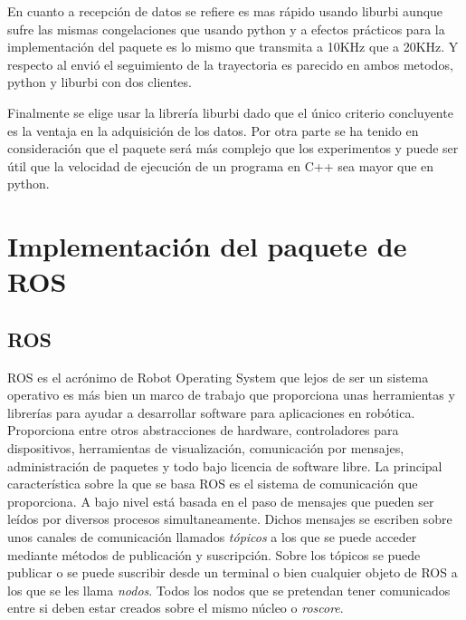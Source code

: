 \documentclass[12pt,a4paper,final,twoside]{book}
\begin{document}
En cuanto a recepción de datos se refiere es mas rápido usando liburbi aunque sufre las mismas congelaciones que usando python y a efectos prácticos para la implementación del paquete es lo mismo que transmita a 10KHz que a 20KHz. Y respecto al envió el seguimiento de la trayectoria es parecido en ambos metodos, python y liburbi con dos clientes. 

Finalmente se elige usar la librería liburbi dado que el único criterio concluyente es la ventaja en la adquisición de los datos. Por otra parte se ha tenido en consideración que el paquete será más complejo que los experimentos y puede ser útil que la velocidad de ejecución de un programa en C++ sea mayor que en python.

\newpage
\chapter{Implementación del paquete de ROS}
\thispagestyle{fancy}
\section{ROS}
\label{ros}
ROS es el acrónimo de Robot Operating System que lejos de ser un sistema operativo es más bien un marco de trabajo que proporciona unas herramientas y librerías para ayudar a desarrollar software para aplicaciones en robótica. Proporciona entre otros abstracciones de hardware, controladores para dispositivos, herramientas de visualización, comunicación por mensajes, administración de paquetes y todo bajo licencia de software libre.
La principal característica sobre la que se basa ROS es el sistema de comunicación que proporciona. A bajo nivel está basada en el paso de mensajes que pueden ser leídos por diversos procesos simultaneamente. Dichos mensajes se escriben sobre unos canales de comunicación llamados \textit{tópicos} a los que se puede acceder mediante métodos de publicación y suscripción. Sobre los tópicos se puede publicar o se puede suscribir desde un terminal o bien cualquier objeto de ROS a los que se les llama \textit{nodos}. Todos los nodos que se pretendan tener comunicados entre si deben estar creados sobre el mismo núcleo o \textit{roscore}.
\end{document}
